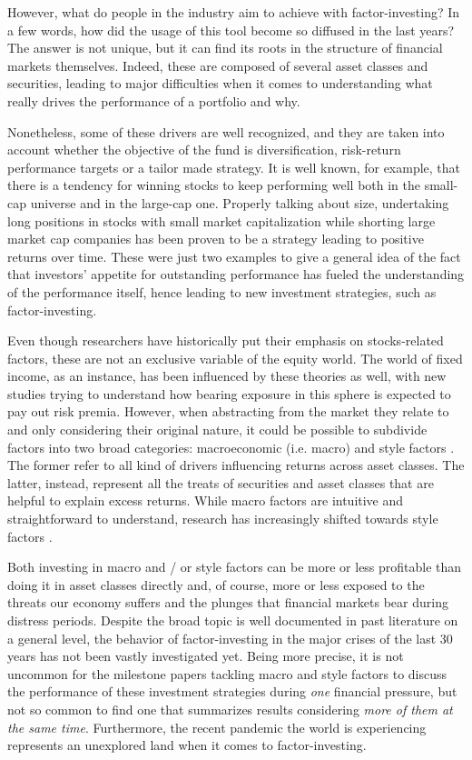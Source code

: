 \documentclass[12pt]{article}
\begin{document}
However, what do people in the industry aim to achieve with factor-investing? In a few words, how did the usage of this tool become so diffused in the last years? The answer is not unique, but it can find its roots in the structure of financial markets themselves. Indeed, these are composed of several asset classes and securities, leading to major difficulties when it comes to understanding what really drives the performance of a portfolio and why.

Nonetheless, some of these drivers are well recognized, and they are taken into account whether the objective of the fund is diversification, risk-return performance targets or a tailor made strategy. It is well known, for example, that there is a tendency for winning stocks to keep performing well both in the small-cap universe and in the large-cap one. Properly talking about size, undertaking long positions in stocks with small market capitalization while shorting large market cap companies has been proven to be a strategy leading to positive returns over time. These were just two examples to give a general idea of the fact that investors' appetite for outstanding performance has fueled the understanding of the performance itself, hence leading to new investment strategies, such as factor-investing.

Even though researchers have historically put their emphasis on stocks-related factors, these are not an exclusive variable of the equity world. The world of fixed income, as an instance, has been influenced by these theories as well, with new studies trying to understand how bearing exposure in this sphere is expected to pay out risk premia. However, when abstracting from the market they relate to and only considering their original nature, it could be possible to subdivide factors into two broad categories: macroeconomic (i.e. macro) and style factors \cite{bender2018asset}. The former refer to all kind of drivers influencing returns across asset classes. The latter, instead, represent all the treats of securities and asset classes that are helpful to explain excess returns. While macro factors are intuitive and straightforward to understand, research has increasingly shifted towards style factors \cite{invesco_factor_investing}. 

Both investing in macro and / or style factors can be more or less profitable than doing it in asset classes directly and, of course, more or less exposed to the threats our economy suffers and the plunges that financial markets bear during distress periods. Despite the broad topic is well documented in past literature on a general level, the behavior of factor-investing in the major crises of the last 30 years has not been vastly investigated yet. Being more precise, it is not uncommon for the milestone papers tackling macro and style factors to discuss the performance of these investment strategies during \textit{one} financial pressure, but not so common to find one that summarizes results considering \textit{more of them at the same time}. Furthermore, the recent pandemic the world is experiencing represents an unexplored land when it comes to factor-investing. 
\end{document}
